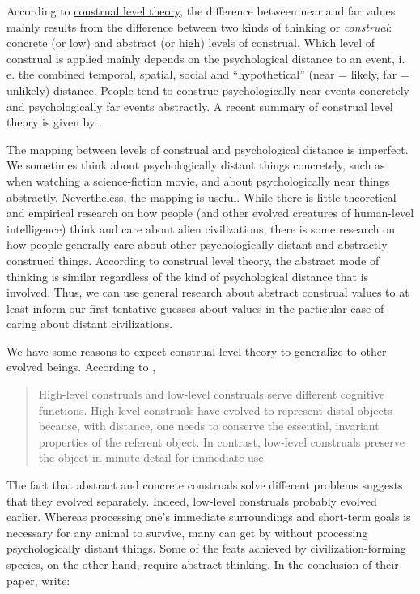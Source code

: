 According to
\href{https://en.wikipedia.org/wiki/Construal_level_theory}{construal
level theory}, the difference between near and far values mainly
results from the difference between two kinds of thinking or
\emph{construal}: concrete (or low) and abstract (or high) levels of
construal. Which level of construal is applied mainly depends on the
psychological distance to an event, i.\,e. the combined temporal, spatial,
social and ``hypothetical'' (near = likely, far = unlikely) distance.
People tend to construe psychologically near events concretely and
psychologically far events abstractly. A recent summary of construal
level theory is given by \citet{trope2010construal}.

The mapping between levels of construal and psychological distance is
imperfect. We sometimes think about psychologically distant things
concretely, such as when watching a science-fiction movie, and about
psychologically near things abstractly. Nevertheless, the mapping is
useful. While there is little theoretical and empirical research on how
people (and other evolved creatures of human-level intelligence) think
and care about alien civilizations, there is some research on how people
generally care about other psychologically distant and abstractly
construed things. According to construal level theory, the abstract mode
of thinking is similar regardless of the kind of psychological distance
that is involved. Thus, we can use general research about abstract
construal values to at least inform our first tentative guesses about
values in the particular case of caring about distant civilizations.

We have some reasons to expect construal level theory to generalize to
other evolved beings. According to \citet[section III, subsection ``Discussion'']{trope2010construal},

\begin{quote}
High-level construals and low-level construals serve different cognitive
functions. High-level construals have evolved to represent distal
objects because, with distance, one needs to conserve the essential,
invariant properties of the referent object. In contrast, low-level
construals preserve the object in minute detail for immediate use.
\end{quote}

The fact that abstract and concrete construals solve different problems
suggests that they evolved separately. Indeed, low-level construals
probably evolved earlier. Whereas processing one's immediate
surroundings and short-term goals is necessary for any animal to
survive, many can get by without processing psychologically distant
things. Some of the feats achieved by civilization-forming species, on
the other hand, require abstract thinking. In the conclusion of their
paper, \citet{trope2010construal} write:

